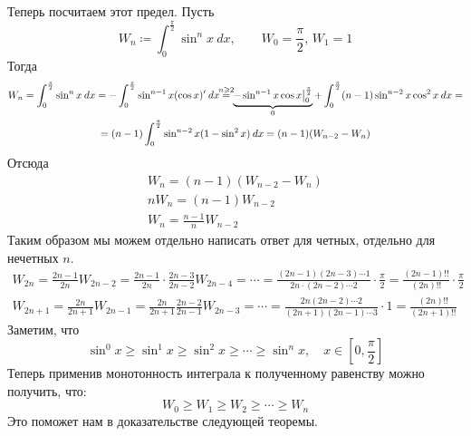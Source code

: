 Теперь посчитаем этот предел. Пусть
\begin{equation*}
  W_n \coloneqq \int_{0}^{\frac{\pi}{2}} \sin^n x \: dx, \qquad W_0 = \frac{\pi}{2},\, W_1 = 1
\end{equation*}
Тогда
\begin{equation*}
  \begin{gathered}
    W_n = \int_{0}^{\frac{\pi}{2}} \sin^n x \: dx =
    -\int_{0}^{\frac{\pi}{2}} \sin^{n - 1}x (\cos x)' \: dx
    \overset{\mathclap{n \geqslant 2}}{=}
    \underbrace{-\sin^{n - 1}x \cos x \big|_{0}^{\frac{\pi}{2}}}_{\mathclap{0}} +
    \int_{0}^{\frac{\pi}{2}}(n - 1)\sin^{n - 2}x \cos^2 x \: dx
    = \\ =
    (n - 1)\int_{0}^{\frac{\pi}{2}} \sin^{n - 2} x (1 - \sin^2 x) \: dx =
    (n -1 )(W_{n - 2} - W_n)
    \end{gathered}
\end{equation*}
Отсюда
\begin{equation*}
    \begin{gathered}
        W_n = (n - 1)(W_{n - 2} - W_n) \\
        nW_n  = (n - 1)W_{n - 2} \\
        W_n = \frac{n - 1}{n} W_{n - 2}
    \end{gathered}
\end{equation*}
Таким образом мы можем отдельно написать ответ для четных, отдельно для нечетных $n$.
\begin{equation*}
  \begin{gathered}
    W_{2n} =
    \frac{2n - 1}{2n}W_{2n - 2} =
    \frac{2n - 1}{2n}\cdot\frac{2n - 3}{2n - 2}W_{2n - 4}
    = \dotsb =
    \frac{(2n - 1)(2n - 3) \dotsm 1}{2n \cdot (2n - 2) \dotsm 2} \cdot \frac{\pi}{2} =
    \frac{(2n - 1)!!}{(2n)!!} \cdot \frac{\pi}{2}
    \\
    W_{2n + 1} =
    \frac{2n}{2n + 1} W_{2n - 1} =
    \frac{2n}{2n + 1}\frac{2n - 2}{2n - 1}W_{2n - 3}
    = \dotsb =
    \frac{2n(2n - 2)\dotsm 2}{(2n + 1)(2n - 1)\dotsm 3}\cdot 1 =
    \frac{(2n)!!}{(2n + 1)!!}
  \end{gathered}
\end{equation*}
Заметим, что
\begin{equation*}
    \sin^{0} x \geqslant \sin^{1} x \geqslant \sin^2 x \geqslant \dotsb \geqslant \sin^n x, \quad x \in [0, \frac{\pi}{2}]
\end{equation*}
Теперь применив монотонность интеграла к полученному равенству можно получить, что:
\begin{equation*}
    W_0 \geqslant W_1 \geqslant W_2 \geqslant \dotsb \geqslant W_n
\end{equation*}
Это поможет нам в доказательстве следующей теоремы.